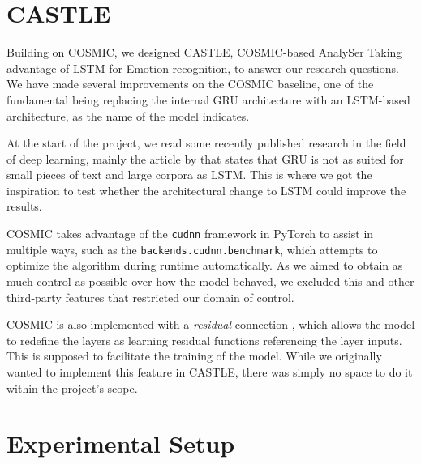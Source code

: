 \documentclass[nofilelist]{cslthse-msc}
\begin{document}

\section{CASTLE}
Building on COSMIC, we designed CASTLE, COSMIC-based AnalySer Taking advantage of LSTM for Emotion recognition, to answer our research questions. We have made several improvements on the COSMIC baseline, one of the fundamental being replacing the internal GRU architecture with an LSTM-based architecture, as the name of the model indicates. 

At the start of the project, we read some recently published research in the field of deep learning, mainly the article by \citet{edseee.922172720200601} that states that GRU is not as suited for small pieces of text and large corpora as LSTM. This is where we got the inspiration to test whether the architectural change to LSTM could improve the results. 


COSMIC takes advantage of the \texttt{cudnn} framework in PyTorch to assist in multiple ways, such as the \texttt{backends.cudnn.benchmark}, which attempts to optimize the algorithm during runtime automatically. As we aimed to obtain as much control as possible over how the model behaved, we excluded this and other third-party features that restricted our domain of control.  

COSMIC is also implemented with a \textit{residual} connection \citep{he2015deep}, which allows the model to redefine the layers as learning residual functions referencing the layer inputs. This is supposed to facilitate the training of the model. While we originally wanted to implement this feature in CASTLE, there was simply no space to do it within the project's scope. 










\section{Experimental Setup}
\end{document}
